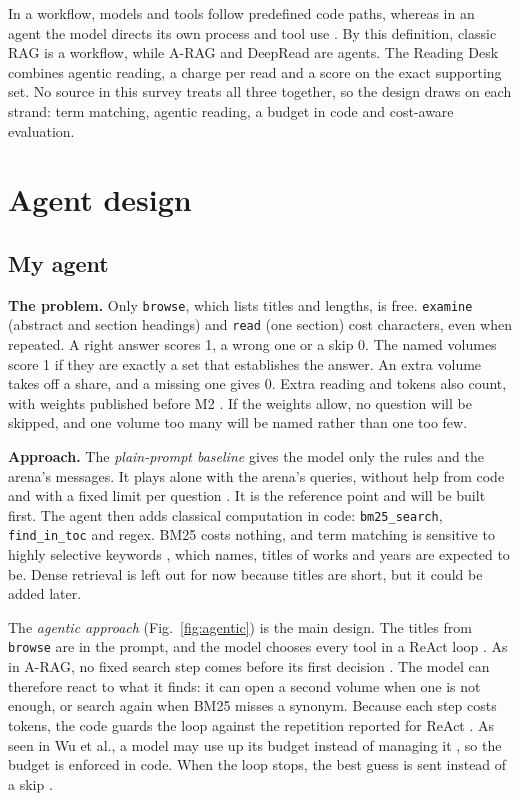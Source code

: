 \documentclass[11pt,a4paper]{article}
\newcommand\code[1]{\texttt{#1}}
\newcommand\lead[1]{\vspace{-\parskip}\textbf{#1}}
\begin{document}
In a workflow, models and tools follow predefined code paths, whereas in an agent the model directs its own
process and tool use \parencite{anthropic2024building}. By this definition, classic RAG is a workflow, while
A-RAG and DeepRead are agents. The Reading Desk combines agentic reading, a charge per read and a score on the exact supporting set. No source in this survey treats all three together, so the design draws on each strand: term matching, agentic reading, a budget in code and cost-aware evaluation.

\section{Agent design}

\subsection{My agent}\label{sec:agent}

\lead{The problem.} Only \code{browse}, which lists titles and lengths, is free. \code{examine} (abstract and
section headings) and \code{read} (one section) cost characters, even when repeated. A right answer scores 1, a wrong one or a skip 0. The named volumes score 1 if they are exactly a set that establishes
the answer. An extra volume takes off a share, and a missing one gives 0. Extra reading and tokens also count,
with weights published before M2 \parencite{course-api}. If the weights allow, no question
will be skipped, and one volume too many will be named rather than one too few.

\lead{Approach.} The \emph{plain-prompt baseline} gives the model only the rules and the arena's messages. It
plays alone with the arena's queries, without help from code and with a fixed limit per question
\parencite{course-s4}. It is the reference point and will be built first. The agent then adds classical
computation in code: \code{bm25\_search}, \code{find\_in\_toc} and regex. BM25 costs nothing, and term matching
is sensitive to highly selective keywords \parencite{karpukhin2020dense}, which names, titles of works and
years are expected to be. Dense retrieval is left out for now because titles are short, but it could be added
later.

The \emph{agentic approach} (Fig.~\ref{fig:agentic}) is the main design. The titles from \code{browse} are
in the prompt, and the model chooses every tool in a ReAct loop \parencite{yao2023react}. As in A-RAG, no
fixed search step comes before its first decision \parencite{du2026arag}. The model can therefore react to
what it finds: it can open a second volume when one is not enough, or search again when
BM25 misses a synonym. Because each step costs tokens, the code guards the loop against the repetition reported for
ReAct \parencite{yao2023react}. As seen in Wu et al., a model may use up its budget instead of managing it
\parencite{wu2026knowledge}, so the budget is enforced in code. When the loop stops, the best guess
is sent instead of a skip \parencite{course-api}.
\end{document}
